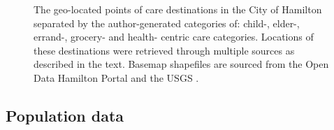 \documentclass[
  authoryear,
  preprint,
  3p]{elsarticle}
\begin{document}
\begin{figure}


\caption{\label{fig-Fig2}The geo-located points of care destinations in
the City of Hamilton separated by the author-generated categories of:
child-, elder-, errand-, grocery- and health- centric care categories.
Locations of these destinations were retrieved through multiple sources
as described in the text. Basemap shapefiles are sourced from the Open
Data Hamilton Portal \citep{opendatahamiltonCityBoundary2023} and the
USGS \citep{greatlakesUSGS2010}.}

\end{figure}%

\subsection{Population data}\label{population-data}
\end{document}
